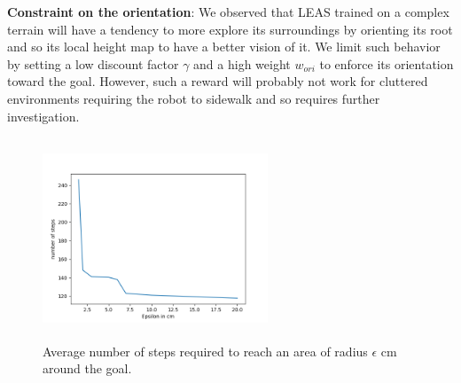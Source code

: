 \textbf{Constraint on the orientation}: 
We observed that LEAS trained on a complex terrain will have a tendency to more explore its surroundings by orienting its root and so its local height map to have a better vision of it.
We limit such behavior by setting a low discount factor $\gamma$ and a high weight $w_{ori}$ to enforce its orientation toward the goal. 
However, such a reward will probably not work for cluttered environments requiring the robot to sidewalk and so requires further investigation.

\begin{figure}
    \centering
    \includegraphics[width=0.6\textwidth, height=6cm]{Figures/Chapter_LEAS/test_epsilon.png}
    \caption{Average number of steps required to reach an area of radius $\epsilon$ cm around the goal.}
    \label{fig:nb_steps_required}
\end{figure}

